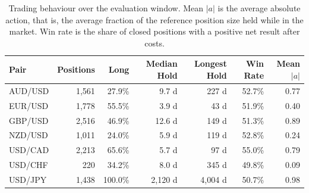\begin{table}[htb!]
\centering
\footnotesize
\caption{Trading behaviour over the evaluation window. Mean $|a|$ is the average absolute action, that is, the average fraction of the reference position size held while in the market. Win rate is the share of closed positions with a positive net result after costs.}
\label{Tables:Behaviour}
\begin{tabular}{@{}lrrrrrr@{}}
\toprule
\textbf{Pair} & \textbf{Positions} & \textbf{Long} & \textbf{Median Hold} & \textbf{Longest Hold} & \textbf{Win Rate} & \textbf{Mean $|a|$} \\
\midrule
AUD/USD & 1,561 & 27.9\% & 9.7 d & 227 d & 52.7\% & 0.77 \\
EUR/USD & 1,778 & 55.5\% & 3.9 d & 43 d & 51.9\% & 0.40 \\
GBP/USD & 2,516 & 46.9\% & 12.6 d & 149 d & 51.3\% & 0.89 \\
NZD/USD & 1,011 & 24.0\% & 5.9 d & 119 d & 52.8\% & 0.24 \\
USD/CAD & 2,213 & 65.6\% & 5.7 d & 97 d & 55.0\% & 0.79 \\
USD/CHF & 220 & 34.2\% & 8.0 d & 345 d & 49.8\% & 0.09 \\
USD/JPY & 1,438 & 100.0\% & 2,120 d & 4,004 d & 50.7\% & 0.98 \\
\bottomrule
\end{tabular}
\end{table}